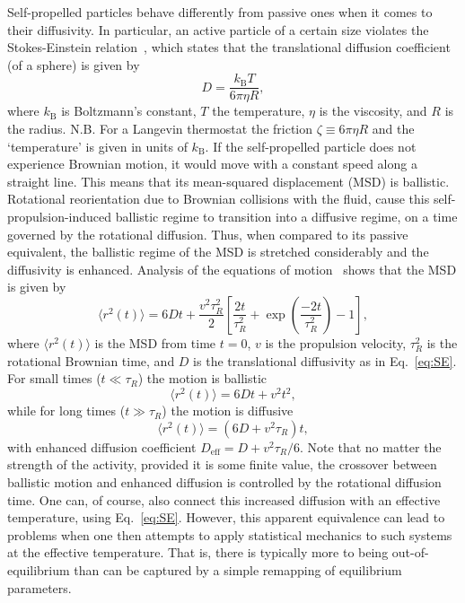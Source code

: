 \documentclass[aip,jcp,reprint,a4paper,onecolumn,amsmath]{revtex4-1}
\begin{document}
Self-propelled particles behave differently from passive ones when it comes to their diffusivity. In particular, an active particle of a certain size violates the Stokes-Einstein relation~\cite{einstein06}, which states that the translational diffusion coefficient (of a sphere) is given by
\begin{equation}
\label{eq:SE} D = \frac{k_{\mathrm{B}}T}{6 \pi \eta R},
\end{equation}
where $k_{\mathrm{B}}$ is Boltzmann's constant, $T$ the temperature, $\eta$ is the viscosity, and $R$ is the radius. N.B. For a Langevin thermostat the friction $\zeta \equiv 6 \pi \eta R$ and the `temperature' is given in units of $k_{\mathrm{B}}$. If the self-propelled particle does not experience Brownian motion, it would move with a constant speed along a straight line. This means that its mean-squared displacement (MSD) is ballistic. Rotational reorientation due to Brownian collisions with the fluid, cause this self-propulsion-induced ballistic regime to transition into a diffusive regime, on a time governed by the rotational diffusion. Thus, when compared to its passive equivalent, the ballistic regime of the MSD is stretched considerably and the diffusivity is enhanced. Analysis of the equations of motion~\cite{Howse_07} shows that the MSD is given by
\begin{equation}
\label{eq:emsd} \langle r^{2}(t) \rangle = 6 D t + \frac{v^{2} \tau^{2}_{R}}{2} \left[ \frac{2 t}{\tau^{2}_{R}} + \exp\left( \frac{-2t}{\tau^{2}_{R}} \right) - 1 \right],
\end{equation}
where $\langle r^{2}(t) \rangle$ is the MSD from time $t=0$, $v$ is the propulsion velocity, $\tau^{2}_{R}$ is the rotational Brownian time, and $D$ is the translational diffusivity as in Eq.~\eqref{eq:SE}. For small times ($t \ll \tau_{R}$) the motion is ballistic
\begin{equation}
\label{eq:bal} \langle r^{2}(t) \rangle = 6 D t + v^{2} t^{2},
\end{equation}
while for long times ($t \gg \tau_{R}$) the motion is diffusive
\begin{equation}
\label{eq:diff} \langle r^{2}(t) \rangle = (6 D + v^{2}\tau_{R}) t,
\end{equation}
with enhanced diffusion coefficient $D_{\mathrm{eff}} = D + v^{2}\tau_{R}/6$.  Note that no matter the strength of the activity, provided it is some finite value, the crossover between ballistic motion and enhanced diffusion is controlled by the rotational diffusion time. One can, of course, also connect this increased diffusion with an effective temperature, using Eq.~\eqref{eq:SE}. However, this apparent equivalence can lead to problems when one then attempts to apply statistical mechanics to such systems at the effective temperature. That is, there is typically more to being out-of-equilibrium than can be captured by a simple remapping of equilibrium parameters.
\end{document}
